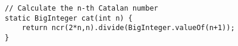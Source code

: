 \begin{verbatim}
// Calculate the n-th Catalan number
static BigInteger cat(int n) {
	return ncr(2*n,n).divide(BigInteger.valueOf(n+1));
}
\end{verbatim}